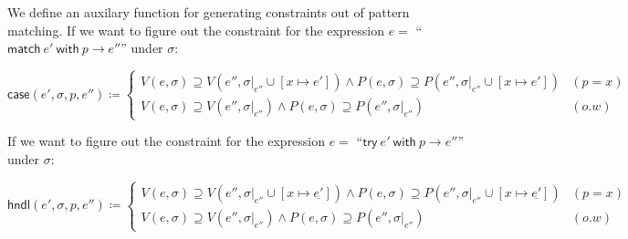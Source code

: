 \documentclass{article}
\newcommand\vbar{|}
\begin{document}
\begin{center}
\begin{prooftree}
\end{prooftree}
\vspace{0.2cm}

\begin{prooftree}
\end{prooftree}
\vspace{0.2cm}

\begin{prooftree}
\end{prooftree}
\end{center}

We define an auxilary function for generating constraints out of pattern matching.
If we want to figure out the constraint for the expression $e=$ ``$\mathsf{match}\: e' \: \mathsf{with}\: p\rightarrow e''$'' under $\sigma$:

\[
\mathsf{case}(e',\sigma,p,e'')\coloneq
\begin{cases}
  V(e,\sigma) \supseteq V(e'',\sigma\vbar_{e''} \cup [x \mapsto e']) \wedge P(e,\sigma) \supseteq P(e'',\sigma\vbar_{e''} \cup [x \mapsto e'])& (p=x)\\
  V(e,\sigma) \supseteq V(e'',\sigma\vbar_{e''}) \wedge P(e,\sigma) \supseteq P(e'',\sigma\vbar_{e''}) & (o.w)
\end{cases}
\]

If we want to figure out the constraint for the expression $e=$ ``$\mathsf{try}\: e' \: \mathsf{with}\: p\rightarrow e''$'' under $\sigma$:

\[
  \mathsf{hndl}(e',\sigma,p,e'')\coloneq
  \begin{cases}
    V(e,\sigma) \supseteq V(e'',\sigma\vbar_{e''} \cup [x \mapsto \underline{e'}]) \wedge P(e,\sigma) \supseteq P(e'',\sigma\vbar_{e''} \cup [x \mapsto \underline{e'}]) & (p=x)\\
    V(e,\sigma) \supseteq V(e'',\sigma\vbar_{e''}) \wedge P(e,\sigma) \supseteq P(e'',\sigma\vbar_{e''}) & (o.w)
  \end{cases}
\]
\end{document}
